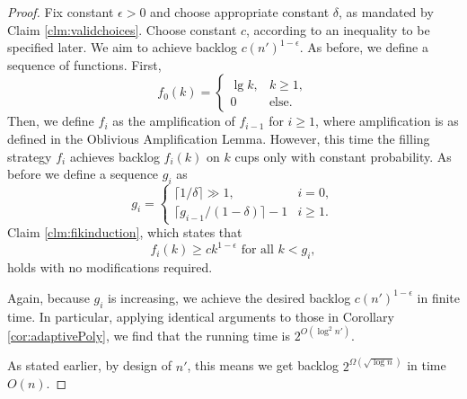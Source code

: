 \documentclass[twocolumn]{article}[10pt]
\begin{document}
\begin{proof}
  Fix constant $\epsilon > 0$ and choose appropriate constant $\delta$, as
  mandated by Claim \ref{clm:validchoices}. Choose constant $c$, according to
  an inequality to be specified later. We aim to achieve backlog
  $c(n')^{1-\epsilon}$.
  As before, we define a sequence of functions. First,
  $$f_0(k) = 
  \begin{cases} 
    \lg k, & k\geq 1, \\
    0 & \text{else.}
  \end{cases}$$
  Then, we define $f_i$ as the amplification of $f_{i-1}$ for $i \ge 1$, where
  amplification is as defined in the Oblivious Amplification Lemma. 
  However, this time the filling strategy $f_i$ achieves backlog $f_i(k)$ on
  $k$ cups only with constant probability.
  As before we define a sequence $g_i$ as 
  $$ g_i = \begin{cases}
    \lceil 1/\delta \rceil \gg 1,  & i = 0,\\
    \lceil g_{i-1}/(1-\delta)\rceil -1 & i  \ge 1.
  \end{cases} $$
  Claim \ref{clm:fikinduction}, which states that 
  $$f_i(k) \ge ck^{1-\epsilon} \text{ for all } k < g_i,$$
  holds with no modifications required.

  Again, because $g_i$ is increasing, we achieve the desired backlog
  $c(n')^{1-\epsilon}$ in finite time. In particular, applying identical
  arguments to those in Corollary \ref{cor:adaptivePoly}, we find that the
  running time is $2^{O(\log^2 n')}$.

  As stated earlier, by design of $n'$, this means we get backlog
  $2^{\Omega(\sqrt{\log n})}$ in time $O(n)$.
\end{proof}
\end{document}

